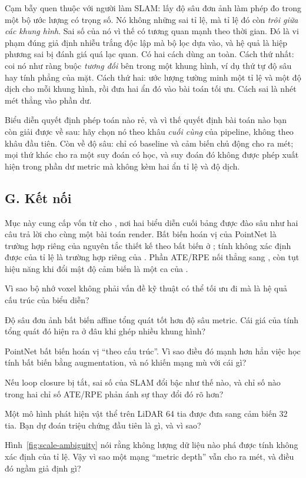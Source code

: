 \documentclass[../../../deep_learning.tex]{subfiles}
\begin{document}
\begin{cambay}
Cạm bẫy quen thuộc với người làm SLAM: lấy độ sâu đơn ảnh làm phép đo trong một bộ ước lượng có trọng số. Nó không những sai tỉ lệ, mà tỉ lệ đó còn \emph{trôi giữa các khung hình}. Sai số của nó vì thế có tương quan mạnh theo thời gian. Đó là vi phạm đúng giả định nhiễu trắng độc lập mà bộ lọc dựa vào, và hệ quả là hiệp phương sai bị đánh giá quá lạc quan. Có hai cách dùng an toàn. Cách thứ nhất: coi nó như ràng buộc \emph{tương đối} bên trong một khung hình, ví dụ thứ tự độ sâu hay tính phẳng của mặt. Cách thứ hai: ước lượng tường minh một tỉ lệ và một độ dịch cho mỗi khung hình, rồi đưa hai ẩn đó vào bài toán tối ưu. Cách sai là nhét mét thẳng vào phần dư.
\end{cambay}

\begin{cannho}
Biểu diễn quyết định phép toán nào rẻ, và vì thế quyết định bài toán nào bạn còn giải được về sau: hãy chọn nó theo khâu \emph{cuối cùng} của pipeline, không theo khâu đầu tiên. Còn về độ sâu: chỉ có baseline và cảm biến chủ động cho ra mét; mọi thứ khác cho ra một suy đoán có học, và suy đoán đó không được phép xuất hiện trong phần dư metric mà không kèm hai ẩn tỉ lệ và độ dịch. 
\end{cannho}

\subsection{G. Kết nối}
Mục này cung cấp vốn từ cho , nơi hai biểu diễn cuối bảng được đào sâu như hai câu trả lời cho cùng một bài toán render. Bất biến hoán vị của PointNet là trường hợp riêng của nguyên tắc thiết kế theo bất biến ở ; tính không xác định được của tỉ lệ là trường hợp riêng của . Phần ATE/RPE nối thẳng sang , còn tụt hiệu năng khi đổi mật độ cảm biến là một ca của .

\begin{tukiem}
\item Vì sao bộ nhớ voxel không phải vấn đề kỹ thuật có thể tối ưu đi mà là hệ quả cấu trúc của biểu diễn?
\item Độ sâu đơn ảnh bất biến affine tổng quát tốt hơn độ sâu metric. Cái giá của tính tổng quát đó hiện ra ở đâu khi ghép nhiều khung hình?
\item PointNet bất biến hoán vị ``theo cấu trúc''. Vì sao điều đó mạnh hơn hẳn việc học tính bất biến bằng augmentation, và nó khiến mạng mù với cái gì?
\item Nếu loop closure bị tắt, sai số của SLAM đổi bậc như thế nào, và chỉ số nào trong hai chỉ số ATE/RPE phản ánh sự thay đổi đó rõ hơn?
\item Một mô hình phát hiện vật thể trên LiDAR 64 tia được đưa sang cảm biến 32 tia. Bạn dự đoán triệu chứng đầu tiên là gì, và vì sao?
\item Hình~\ref{fig:scale-ambiguity} nói rằng không lượng dữ liệu nào phá được tính không xác định của tỉ lệ. Vậy vì sao một mạng ``metric depth'' vẫn cho ra mét, và điều đó ngầm giả định gì?
\end{tukiem}
\ifSubfilesClassLoaded{\printbibliography[title={Nguồn}]}{}
\end{document}
